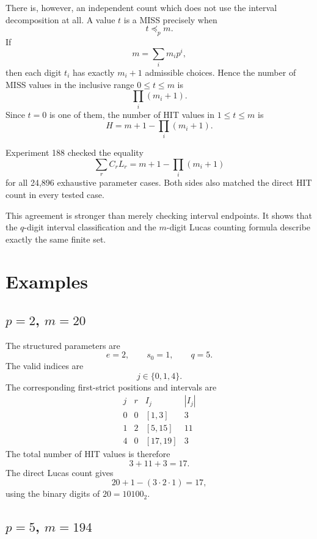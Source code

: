 \documentclass[11pt,a4paper]{article}
\theoremstyle{definition}
\theoremstyle{remark}
\begin{document}
There is, however, an independent count which does not use the interval decomposition at all.  A value $t$ is a MISS precisely when
\[
 t\preceq_p m.
\]
If
\[
 m=\sum_i m_i p^i,
\]
then each digit $t_i$ has exactly $m_i+1$ admissible choices.  Hence the number of MISS values in the inclusive range $0\le t\le m$ is
\begin{equation}
 \prod_i(m_i+1).
 \label{eq:miss-count}
\end{equation}
Since $t=0$ is one of them, the number of HIT values in $1\le t\le m$ is
\begin{equation}
 \boxed{
 H=m+1-\prod_i(m_i+1).
 }
 \label{eq:direct-HIT-count}
\end{equation}

Experiment 188 checked the equality
\begin{equation}
 \sum_r C_rL_r
 =
 m+1-\prod_i(m_i+1)
 \label{eq:two-counts}
\end{equation}
for all 24,896 exhaustive parameter cases.  Both sides also matched the direct HIT count in every tested case.

This agreement is stronger than merely checking interval endpoints.  It shows that the $q$-digit interval classification and the $m$-digit Lucas counting formula describe exactly the same finite set.

\section{Examples}

\subsection{$p=2$, $m=20$}

The structured parameters are
\[
 e=2,
 \qquad
 s_0=1,
 \qquad
 q=5.
\]
The valid indices are
\[
 j\in\{0,1,4\}.
\]
The corresponding first-strict positions and intervals are
\[
\begin{array}{c|c|c|c}
 j&r&I_j&|I_j|\\
\hline
 0&0&[1,3]&3\\
 1&2&[5,15]&11\\
 4&0&[17,19]&3
\end{array}
\]
The total number of HIT values is therefore
\[
3+11+3=17.
\]
The direct Lucas count gives
\[
20+1-(3\cdot2\cdot1)=17,
\]
using the binary digits of $20=10100_2$.

\subsection{$p=5$, $m=194$}
\end{document}
